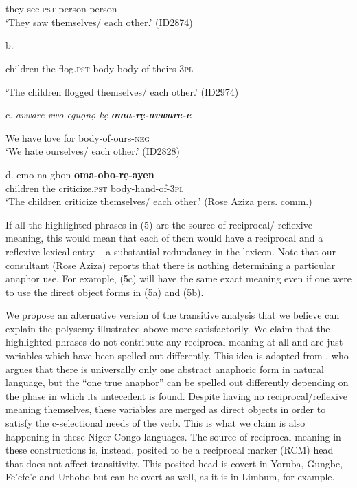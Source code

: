 \documentclass[output=paper]{langsci/langscibook}
\begin{document}
\begin{listWWviiiNumxlileveli}
\item \ea\label{ex:}
\\
\ea\label{ex:}
\\
\end{listWWviiiNumxlileveli}
       they   see.\textsc{pst}   person-person \\
\glt   ‘They saw themselves/ each other.’ (ID2874)
\z

\glt b.  \textstylelsLanginfoChar{\textit{ }}
\z

\glt   children  the  flog.\textsc{pst}  body-body-of-theirs-\textsc{3pl}
\z

\glt   ‘The children flogged themselves/ each other.’ (ID2974)
\z

\glt c.  \textit{avware   vwo  eguọnọ   kẹ   }\textbf{\textit{oma-rẹ-avware-e}}\textit{ }  
\z

       We     have   love     for   body-of-ours-\textsc{neg}  \\
\glt   ‘We hate ourselves/ each other.’  (ID2828)
\z

\gll \textup{d.  }emo    na    gbon     \textbf{oma-obo-rẹ-ayen} \\
       children  the  criticize.\textsc{pst}   body-hand-of-\textsc{3pl}\\
\glt   ‘The children criticize themselves/ each other.’ (Rose Aziza pers. comm.)
\z

If all the highlighted phrases in (5) are the source of reciprocal/ reflexive meaning, this would mean that each of them would have a reciprocal and a reflexive lexical entry – a substantial redundancy in the lexicon. Note that our consultant (Rose Aziza) reports that there is nothing determining a particular anaphor use. For example, (5c) will have the same exact meaning even if one were to use the direct object forms in (5a) and (5b). 

  We propose an alternative version of the transitive analysis that we believe can explain the polysemy illustrated above more satisfactorily. We claim that the highlighted phrases do not contribute any reciprocal meaning at all and are just variables which have been spelled out differently. This idea is adopted from \citet{Safir2014}, who argues that there is universally only one abstract anaphoric form in natural language, but the “one true anaphor” can be spelled out differently depending on the phase in which its antecedent is found. Despite having no reciprocal/reflexive meaning themselves, these variables are merged as direct objects in order to satisfy the c-selectional needs of the verb. This is what we claim is also happening in these Niger-Congo languages. The source of reciprocal meaning in these constructions is, instead, posited to be a reciprocal marker (RCM) head that does not affect transitivity. This posited head is covert in Yoruba, Gungbe, Fe'efe'e and Urhobo but can be overt as well, as it is in Limbum, for example.
\end{document}
